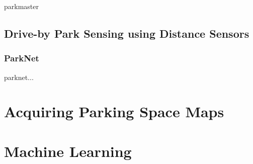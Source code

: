 parkmaster \cite{Grassi:2017:PIE:3132211.3134452}



\subsection{Drive-by Park Sensing using Distance Sensors}
\label{sec:related_driveby_park_sensing_distance}

\subsubsection{ParkNet}
\label{sec:parknet}

parknet... \cite{Mathur:2010:PDS:1814433.1814448}



\section{Acquiring Parking Space Maps}



\section{Machine Learning}

